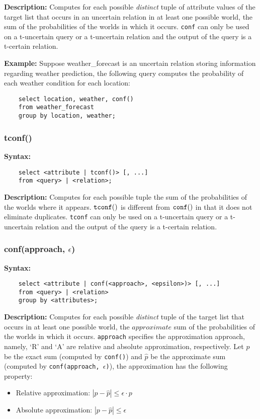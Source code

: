 \noindent \textbf{Description:}
Computes for each possible {\em distinct}\/ tuple of attribute values of the target list that occurs in an uncertain relation in at least one possible world, the sum of the probabilities of the worlds in which it occurs. {\tt conf} can only be used on a t-uncertain query or a t-uncertain relation and the output of the query is a t-certain relation.

\noindent \textbf{Example:}
Suppose weather\_forecast is an uncertain relation storing information regarding weather prediction, the following query computes the probability of each weather condition for each location:
\begin{verbatim}
	select location, weather, conf()
	from weather_forecast
	group by location, weather; 
\end{verbatim}

\subsubsection{tconf()}
\noindent \textbf{Syntax:}
\begin{verbatim}
	select <attribute | tconf()> [, ...]
	from <query> | <relation>;
\end{verbatim}

\noindent \textbf{Description:}
Computes for each possible tuple the sum of the probabilities of the worlds where it appears. ${\tt tconf()}$ is different from ${\tt conf()}$ in that it does not eliminate duplicates. {\tt tconf} can only be used on a t-uncertain query or a t-uncertain relation and the output of the query is a t-certain relation.

\subsubsection{conf(approach, $\epsilon$)}

\noindent \textbf{Syntax:}
\begin{verbatim}
	select <attribute | conf(<approach>, <epsilon>)> [, ...]
	from <query> | <relation>	
	group by <attributes>; 
\end{verbatim}

\noindent \textbf{Description:}
Computes for each possible {\em distinct}\/ tuple of the target list that occurs in at least one possible world, the $approximate$ sum of the probabilities of the worlds in which it occurs. {\tt approach} specifies the approximation approach, namely, `R' and `A' are relative and absolute approximation, respectively. Let $p$ be the exact sum (computed by {\tt conf()}) and $\hat{p}$ be the approximate sum (computed by {\tt conf(approach, $\epsilon$)}), the approximation has the following property:
\begin{itemize}
\item Relative approximation: $|p - \hat{p}| \le \epsilon \cdot p$
\item Absolute approximation: $|p - \hat{p}| \le \epsilon$
\end{itemize}

